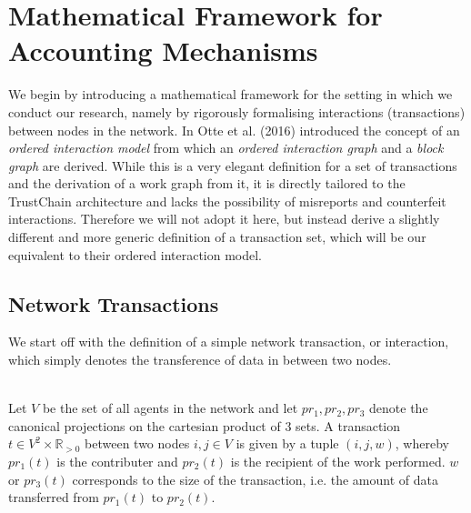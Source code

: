 \chapter{Mathematical Framework for Accounting Mechanisms}
\label{chap:Mathematical Framework for Accounting Mechanisms}
\noindent{}We begin by introducing a mathematical framework for the setting in which we conduct our research, namely by rigorously formalising interactions (transactions) between nodes in the network. In \cite{Sybil-resistant Trust Mechanisms in Distributed Systems} Otte et al. (2016) introduced the concept of an {\it ordered interaction model} from which an {\it ordered interaction graph} and a {\it block graph} are derived. While this is a very elegant definition for a set of transactions and the derivation of a work graph from it, it is directly tailored to the TrustChain architecture and lacks the possibility of misreports and counterfeit interactions. Therefore we will not adopt it here, but instead derive a slightly different and more generic definition of a transaction set, which will be our equivalent to their ordered interaction model.\vspace{1em}\\


\section{Network Transactions}
\label{sec:Network Transactions}
\noindent{}We start off with the definition of a simple network transaction, or interaction, which simply denotes the transference of data in between two nodes.\vspace{1em}\\

\begin{definition}\ \\
\label{def:Agent Transaction}
\noindent{}Let $V$ be the set of all agents in the network and let $pr_1,pr_2,pr_3$ denote the canonical projections on the cartesian product of 3 sets. A transaction $t\in{}V^2\times\mathbb{R}_{>0}$ between two nodes $i,j\in{}V$ is given by a tuple $(i,j,w)$, whereby $pr_1(t)$ is the contributer and $pr_2(t)$ is the recipient of the work performed. $w$ or $pr_3(t)$ corresponds to the size of the transaction, i.e. the amount of data transferred from $pr_1(t)$ to $pr_2(t)$. \vspace{1em}\\ %
\end{definition}

